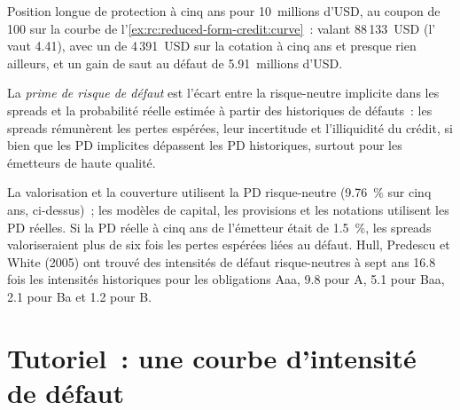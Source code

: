 \begin{example}\label{ex:rc:reduced-form-credit:position}
Position longue de protection à cinq ans pour 10~millions d'USD, au coupon de 100 sur la courbe de
l'\cref{ex:rc:reduced-form-credit:curve}~: valant 88\,133~USD (l' vaut 4.41),
avec un  de 4\,391~USD sur la cotation à cinq ans et presque rien ailleurs, et un
gain de saut au défaut de 5.91~millions d'USD.
\end{example}

\begin{definition}\label{def:rc:reduced-form-credit:premium}
La \emph{prime de risque de défaut} est l'écart entre
la  risque-neutre implicite dans les spreads et la probabilité réelle
estimée à partir des historiques de défauts~: les spreads rémunèrent les pertes espérées, leur
incertitude et l'illiquidité du crédit, si bien que les PD implicites dépassent les PD historiques,
surtout pour les émetteurs de haute qualité.
\end{definition}

\begin{remark}\label{rem:rc:reduced-form-credit:which}
La valorisation et la couverture utilisent la PD risque-neutre (9.76~\% sur cinq ans, ci-dessus)~; les modèles
de capital, les provisions et les notations utilisent les PD réelles. Si la PD réelle à cinq ans de
l'émetteur était de 1.5~\%, les spreads valoriseraient plus de six fois les pertes espérées liées au défaut. Hull,
Predescu et White (2005) ont trouvé des intensités de défaut risque-neutres à sept ans 16.8 fois
les intensités historiques pour les obligations Aaa, 9.8 pour A, 5.1 pour Baa, 2.1 pour Ba et 1.2 pour B.
\end{remark}

\section{Tutoriel~: une courbe d'intensité de défaut}\label{tut:rc:reduced-form-credit:tutorial}

